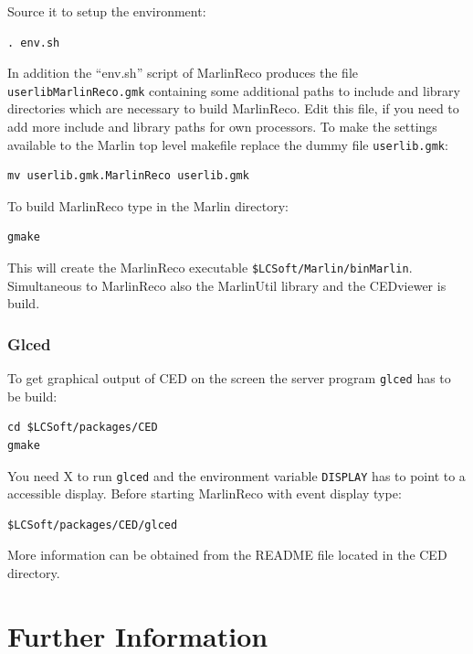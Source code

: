 Source it to setup the environment:

\begin{verbatim}
. env.sh 
\end{verbatim}

In addition the ``env.sh'' script of MarlinReco produces the file 
{\tt userlibMarlinReco.gmk} containing some additional paths 
to include and library directories which are necessary to build 
MarlinReco. Edit this file, if you need to add 
more include and library paths for own processors. To make the settings 
available to the Marlin top level makefile replace the dummy file 
{\tt userlib.gmk}:

\begin{verbatim}
mv userlib.gmk.MarlinReco userlib.gmk
\end{verbatim}

To build MarlinReco type in the Marlin directory:

\begin{verbatim}
gmake
\end{verbatim}

This will create the MarlinReco executable {\tt \$LCSoft/Marlin/binMarlin}. 
Simultaneous to MarlinReco also the MarlinUtil library and the CEDviewer is 
build. 

\subsubsection*{Glced}

To get graphical output of CED on the screen the server program {\tt glced}
has to be build: 

\begin{verbatim} 
cd $LCSoft/packages/CED
gmake
\end{verbatim}

You need X to run {\tt glced} and the environment variable 
{\tt DISPLAY} has to point to a accessible display. Before starting
MarlinReco with event display type:

\begin{verbatim}
$LCSoft/packages/CED/glced
\end{verbatim}

More information can be obtained from the README file located in the 
CED directory. 

\section{Further Information}

